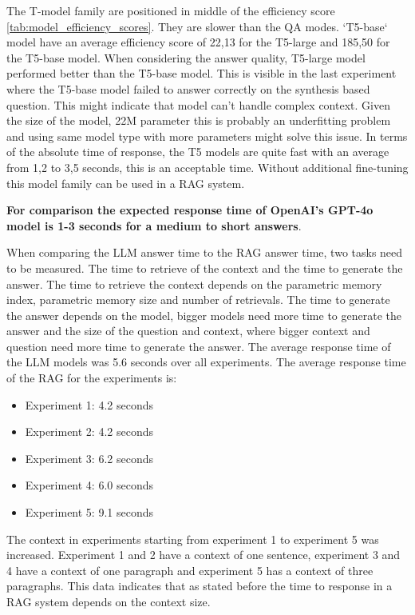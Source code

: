 \documentclass{wseas}
\begin{document}
The T-model family are positioned in middle of the efficiency score \autoref{tab:model_efficiency_scores}. They are slower than the QA modes. 
`T5-base` model have an average efficiency score of 22,13 for the T5-large and 185,50 for the T5-base model. When considering the 
answer quality, T5-large model performed better than the T5-base model. This is visible in the last experiment where the T5-base model
failed to answer correctly on the synthesis based question. This might indicate that model can't handle complex context. 
Given the size of the model, 22M parameter this is probably an underfitting problem and using same model type with more parameters might solve this issue.
In terms of the absolute time of response, the T5 models are quite fast with an average from 1,2 to 3,5 seconds, this is an acceptable time.
Without additional fine-tuning this model family can be used in a RAG system.

\textbf{For comparison the expected response time of OpenAI's GPT-4o model is 1-3 seconds for a medium to short answers}.

When comparing the LLM answer time to the RAG answer time, two tasks need to be measured. The time to retrieve of the context and the time to generate the answer.
The time to retrieve the context depends on the parametric memory index, parametric memory size and number of retrievals. 
The time to generate the answer depends on the model, bigger models need more time to generate the answer and the size of the question and context, 
where bigger context and question need more time to generate the answer. The average response time of the LLM models was 5.6 seconds over all experiments.
The average response time of the RAG for the experiments is:
\begin{itemize}
  \item Experiment 1: 4.2 seconds
  \item Experiment 2: 4.2 seconds
  \item Experiment 3: 6.2 seconds
  \item Experiment 4: 6.0 seconds
  \item Experiment 5: 9.1 seconds
\end{itemize}

The context in experiments starting from experiment 1 to experiment 5 was increased. Experiment 1 and 2 have a context of one sentence, experiment 3 and 4 have a context of one paragraph and experiment 5 has a context of three paragraphs.
This data indicates that as stated before the time to response in a RAG system depends on the context size.
\end{document}
